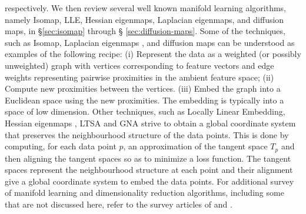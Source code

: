 respectively. We then review several well known manifold learning
algorithms, namely Isomap, LLE, Hessian eigenmaps, Laplacian
eigenmaps, and diffusion maps, in \S \ref{sec:isomap} through \S
\ref{sec:diffusion-maps}. Some of the techniques, such as Isomap,
Laplacian eigenmaps \citep{belkin03:_laplac}, and diffusion maps
\citep{coifman06:_diffus_maps} can be understood as examples of the
following recipe: (i) Represent the data as a weighted (or possibly
unweighted) graph with vertices corresponding to feature vectors and
edge weights representing pairwise proximities in the ambient feature
space; (ii) Compute new proximities between the vertices. (iii) Embed
the graph into a Euclidean space using the new proximities. The
embedding is typically into a space of low dimension. Other
techniques, such as Locally Linear Embedding, Hessian eigenmaps
\citep{donoho03:_hesian}, LTSA
\citep{zhang03:_intel_data_engin_autom_learn} and GNA
\citep{brand05:_from} strive to obtain a global coordinate system that
preserves the neighbourhood structure of the data points. This is done
by computing, for each data point $p$, an approximation of the tangent
space $T_p$ and then aligning the tangent spaces so as to minimize a
loss function. The tangent spaces represent the neighbourhood
structure at each point and their alignment give a global coordinate
system to embed the data points. For additional survey of manifold
learning and dimensionality reduction algorithms, including some that
are not discussed here, refer to the survey articles of
\citet{burges05:_data} and \citet{saul06:_semis}.


